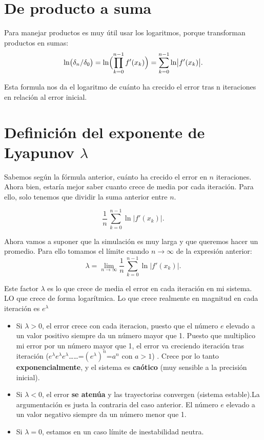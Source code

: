 \documentclass[
  11pt,
  a4paper,
  DIV=11,
  numbers=noendperiod]{scrreprt}
\providecommand{\tightlist}{%
  \setlength{\itemsep}{0pt}\setlength{\parskip}{0pt}}
\begin{document}
\section{De producto a suma}\label{de-producto-a-suma}

Para manejar productos es muy útil usar los logaritmos, porque
transforman productos en sumas: \[
\ln\bigl(\delta_n/\delta_0\bigr)
= \ln\Bigl(\prod_{k=0}^{n-1} f'(x_k)\Bigr)
= \sum_{k=0}^{n-1}\ln\bigl|f'(x_k)\bigr|.
\]

Esta formula nos da el logaritmo de cuánto ha crecido el error tras n
iteraciones en relación al error inicial.

\section{\texorpdfstring{Definición del exponente de Lyapunov
\(\lambda\)}{Definición del exponente de Lyapunov \textbackslash lambda}}\label{definiciuxf3n-del-exponente-de-lyapunov-lambda}

Sabemos según la fórmula anterior, cuánto ha crecido el error en \(n\)
iteraciones. Ahora bien, estaría mejor saber cuanto crece de media por
cada iteración. Para ello, solo tenemos que dividir la suma anterior
entre \(n\).

\[
\frac{1}{n}\,\sum_{k=0}^{n-1}\ln\bigl|f'(x_k)\bigr|.
\]

Ahora vamos a suponer que la simulación es muy larga y que queremos
hacer un promedio. Para ello tomamos el límite cuando \(n\to\infty\) de
la expresión anterior: \[
\lambda
= \lim_{n\to\infty}
\frac{1}{n}\,\sum_{k=0}^{n-1}\ln\bigl|f'(x_k)\bigr|.
\]

Este factor \(\lambda\) es lo que crece de media el error en cada
iteración en mi sistema. LO que crece de forma logarítmica. Lo que crece
realmente en magnitud en cada iteración es \(e^\lambda\)

\begin{itemize}
\tightlist
\item
  Si \(\lambda>0\), el error crece con cada iteracion, puesto que el
  número \(e\) elevado a un valor positivo siempre da un número mayor
  que 1. Puesto que multiplico mi error por un número mayor que 1, el
  error va creciendo iteración tras iteración
  (\(e^\lambda\)\(e^\lambda\)\(e^\lambda\)\ldots\ldots=\((e^\lambda)^n\)=\(a^n\)
  con \(a>1\)) . Crece por lo tanto \textbf{exponencialmente}, y el
  sistema es \textbf{caótico} (muy sensible a la precisión inicial).
\item
  Si \(\lambda<0\), el error \textbf{se atenúa} y las trayectorias
  convergen (sistema estable).La argumentación es justa la contraria del
  caso anterior. El número \(e\) elevado a un valor negativo siempre da
  un número menor que 1.
\item
  Si \(\lambda=0\), estamos en un caso límite de inestabilidad neutra.
\end{itemize}
\end{document}
